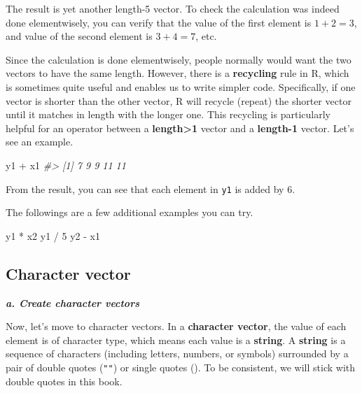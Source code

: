 \documentclass[
]{book}
\newenvironment{Shaded}{\begin{snugshade}}{\end{snugshade}}
\newcommand{\CommentTok}[1]{\textcolor[rgb]{0.56,0.35,0.01}{\textit{#1}}}
\newcommand{\DecValTok}[1]{\textcolor[rgb]{0.00,0.00,0.81}{#1}}
\newcommand{\NormalTok}[1]{#1}
\newcommand{\SpecialCharTok}[1]{\textcolor[rgb]{0.00,0.00,0.00}{#1}}
\begin{document}
The result is yet another length-5 vector. To check the calculation was indeed done elementwisely, you can verify that the value of the first element is \(1 + 2 = 3\), and value of the second element is \(3 + 4 = 7\), etc.

Since the calculation is done elementwisely, people normally would want the two vectors to have the same length. However, there is a \textbf{recycling} rule in R, which is sometimes quite useful and enables us to write simpler code. Specifically, if one vector is shorter than the other vector, R will recycle (repeat) the shorter vector until it matches in length with the longer one. This recycling is particularly helpful for an operator between a \textbf{length\textgreater1} vector and a \textbf{length-1} vector. Let's see an example.

\begin{Shaded}
\begin{Highlighting}[]
\NormalTok{y1 }\SpecialCharTok{+}\NormalTok{ x1}
\CommentTok{\#\textgreater{} [1]  7  9  9 11 11}
\end{Highlighting}
\end{Shaded}

From the result, you can see that each element in \texttt{y1} is added by 6.

The followings are a few additional examples you can try.

\begin{Shaded}
\begin{Highlighting}[]
\NormalTok{y1 }\SpecialCharTok{*}\NormalTok{ x2}
\NormalTok{y1 }\SpecialCharTok{/} \DecValTok{5}
\NormalTok{y2 }\SpecialCharTok{{-}}\NormalTok{ x1}
\end{Highlighting}
\end{Shaded}

\hypertarget{vector-character}{%
\subsection{Character vector}\label{vector-character}}

\textbf{\emph{a. Create character vectors}}

Now, let's move to character vectors. In a \textbf{character vector}, the value of each element is of character type, which means each value is a \textbf{string}. A \textbf{string} is a sequence of characters (including letters, numbers, or symbols) surrounded by a pair of double quotes (\texttt{""}) or single quotes (\texttt{\textquotesingle{}\textquotesingle{}}). To be consistent, we will stick with double quotes in this book.
\end{document}
